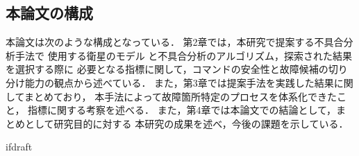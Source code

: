 \documentclass[11pt]{jsreport}
\begin{document}
\subsection{本論文の構成}
本論文は次のような構成となっている．
第2章では，本研究で提案する不具合分析手法で
使用する衛星のモデル%
と不具合分析のアルゴリズム，探索された結果を選択する際に
必要となる指標に関して，コマンドの安全性と故障候補の切り分け能力の観点から述べている．
また，第3章では提案手法を実践した結果に関してまとめており，
本手法によって故障箇所特定のプロセスを体系化できたこと，
指標に関する考察を述べる．
また，第4章では本論文での結論として，まとめとして研究目的に対する
本研究の成果を述べ，今後の課題を示している．

\expandafter\ifx\csname ifdraft\endcsname\relax
\end{document}
